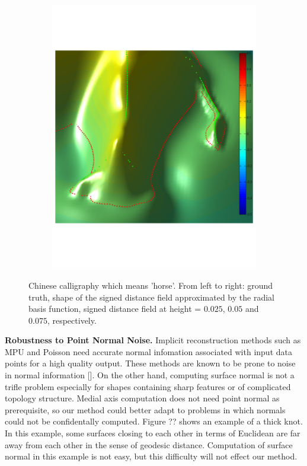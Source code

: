 \documentclass[annual]{acmsiggraph}
\begin{document}
\begin{figure}
\begin{subfigure}[b]{0.3\linewidth}
                \includegraphics[width=\textwidth]{images/rhenoceros/3.pdf}
        \end{subfigure}
        \caption{Chinese calligraphy which means 'horse'. From left to right: ground truth, shape of the signed distance field approximated by the radial basis function, signed distance field at height = $0.025$, $0.05$ and $0.075$, respectively. }
				\label{fig:horse}
\end{figure}


\textbf{Robustness to Point Normal Noise. }
Implicit reconstruction methods such as MPU and Poisson need accurate normal infomation associated with input data points for a high quality output. These methods are known to be prone to noise in normal information []. On the other hand, computing surface normal is not a trifle problem especially for shapes containing sharp features or of complicated topology structure. Medial axis computation does not need point normal as prerequisite, so our method could better adapt to problems in which normals could not be confidentally computed. Figure ?? shows an example of a thick knot. In this example, some surfaces closing to each other in terms of Euclidean are far away from each other in the sense of geodesic distance. Computation of surface normal in this example is not easy, but this difficulty will not effect our method.
\end{document}
